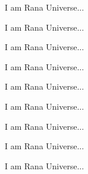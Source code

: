 \documentclass[12pt, letterpaper]{article}
\begin{document}
\vspace{10em}

I am Rana Universe...

I am Rana Universe...

I am Rana Universe...

I am Rana Universe...

I am Rana Universe...

I am Rana Universe...

I am Rana Universe...

I am Rana Universe...

I am Rana Universe...

\vspace{3em}





\lipsum[1]

\lipsum[2]

\vspace{1em}

\lipsum[1]




\end{document}
